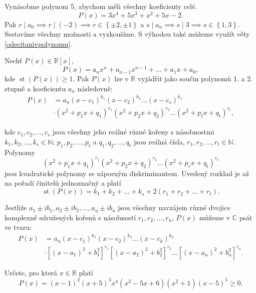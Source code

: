 \begin{reseni}
Vynásobme polynom 5, abychom měli všechny koeficienty celé.
$$P(x) = 3x^4+5x^3+x^2+5x-2.$$
Pak $r \mid a_0 \implies r\mid (-2) \implies r \in \left \{ \pm 2, \pm 1 \right \} $
a $s \mid a_n\implies s \mid 3 \implies s \in \left \{ 1, 3 \right \} $.
Sestavíme všechny možnosti a vyzkoušíme. S výhodou také můžeme využít věty
\ref{odecitanivpolynomu}.
\end{reseni}


\begin{veta}
  Nechť $P(x) \in \mathbb R [x]$,
  $$P(x) = a_n x^n + a_{n-1} x^{n-1} + \dots + a_1 x + a_0,$$
  kde $\operatorname{st}(P(x)) \geq 1$. Pak $P(x)$ lze v $\mathbb R$ vyjádřit jako součin polynomů 1. a 2. stupně a koeficientu $a_n$ následovně:
  \begin{align*}
    P(x) & = a_n(x-c_1)^{k_1}(x-c_2)^{k_2} \dots (x-c_s)^{k_s}\\
    & \cdot (x^2+p_1 x + q_1)^{r_1}(x^2+p_2 x + q_2)^{r_2} \dots (x^2+p_t x + q_t)^{r_t},
  \end{align*}


  kde $c_1,c_2, \dots, c_s$ jsou všechny jeho reálné různé kořeny s násobnostmi $k_1, k_2, \dots, k_s \in \mathbb N$;
  $p_1, p_2, \dots, p_t$ a $q_1, q_2, \dots, q_t$ jsou reálná čísla, $r_1, r_2, \dots, r_t \in \mathbb N$.
  Polynomy
  $$(x^2+p_1 x + q_1)^{r_1}(x^2+p_2 x + q_2)^{r_2} \dots (x^2+p_r x + q_t)^{r_t}$$
  jsou kvadratické polynomy se záporným diskriminantem. Uvedený rozklad je až na pořadí činitelů
  jednoznačný a platí
  $$\operatorname{st}(P(x)) = k_1 + k_2 + \dots + k_s + 2(r_1 + r_2 + \dots + r_t).$$

  Jestliže $a_1 \pm ib_1, a_2 \pm ib_2, \dots, a_u \pm ib_u$ jsou všechny navzájem různé
  dvojice komplexně sdružených kořenů s násobností $r_1, r_2, \dots, r_u$, $P(x)$ můžeme v $\mathbb C$ psát ve tvaru:
  \begin{align*}
    P(x) & = a_n(x-c_1)^{k_1}(x-c_2)^{k_2} \dots (x-c_k)^{k_k}\\
    & \cdot  \left [(x-a_1)^2+b_1^2\right ]^{r_1}\left [(x-a_2)^2+b_2^2\right]^{r_2} \dots \left [(x-a_u)^2+b_u^2\right ]^{r_u}.
  \end{align*}
\end{veta}

\begin{priklad}
    Určete, pro která $x \in \mathbb R$ platí
    $$P(x)=(x-1)^2(x+5)^3x^4(x^2-5x+6)(x^2+1)(x-5)^5 \geq 0.$$
\end{priklad}

